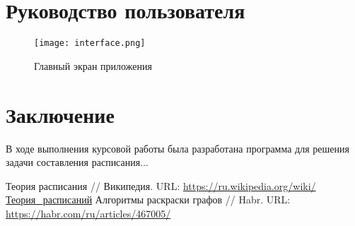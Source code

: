 \documentclass[a4paper,12pt]{article}
\begin{document}
\section*{Руководство пользователя}
\begin{figure}[h]
\centering
\texttt{[image: interface.png]}
\caption{Главный экран приложения}
\end{figure}

\section*{Заключение}
В ходе выполнения курсовой работы была разработана программа для решения задачи составления расписания...

\begin{thebibliography}{9}
 Теория расписания // Википедия. URL: \url{https://ru.wikipedia.org/wiki/Теория_расписаний}
 Алгоритмы раскраски графов // Habr. URL: \url{https://habr.com/ru/articles/467005/}
\end{thebibliography}
\end{document}

